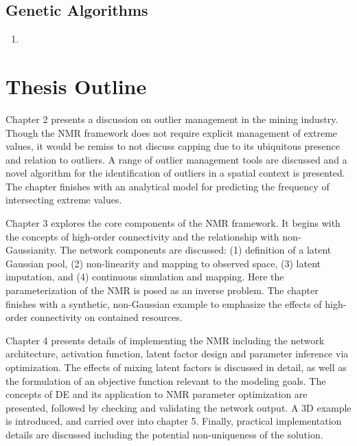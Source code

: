 \FloatBarrier
\subsection{Genetic Algorithms}
\label{subsec:01genetic}

\begin{enumerate}
    \item \cite{price2013differential, georgioudakis2020comparative,bilal2020differential, piotrowski2017review, penunuri2016study, conn2009introduction, rios2013derivativefree}
\end{enumerate}

\FloatBarrier
\section{Thesis Outline}
\label{sec:01outline}

Chapter 2 presents a discussion on outlier management in the mining industry. Though the \gls{NMR} framework does not require explicit management of extreme values, it would be remiss to not discuss capping due to its ubiquitous presence and relation to outliers. A range of outlier management tools are discussed and a novel algorithm for the identification of outliers in a spatial context is presented. The chapter finishes with an analytical model for predicting the frequency of intersecting extreme values.

Chapter 3 explores the core components of the \gls{NMR} framework. It begins with the concepts of high-order connectivity and the relationship with non-Gaussianity. The network components are discussed: (1) definition of a latent Gaussian pool, (2) non-linearity and mapping to observed space, (3) latent imputation, and (4) continuous simulation and mapping. Here the parameterization of the \gls{NMR} is posed as an inverse problem. The chapter finishes with a synthetic, non-Gaussian example to emphasize the effects of high-order connectivity on contained resources.

Chapter 4 presents details of implementing the \gls{NMR} including the network architecture, activation function, latent factor design and parameter inference via optimization. The effects of mixing latent factors is discussed in detail, as well as the formulation of an objective function relevant to the modeling goals. The concepts of \acrfull{DE} and its application to \gls{NMR} parameter optimization are presented, followed by checking and validating the network output. A \gls{3D} example is introduced, and carried over into chapter 5. Finally, practical implementation details are discussed including the potential non-uniqueness of the solution.

